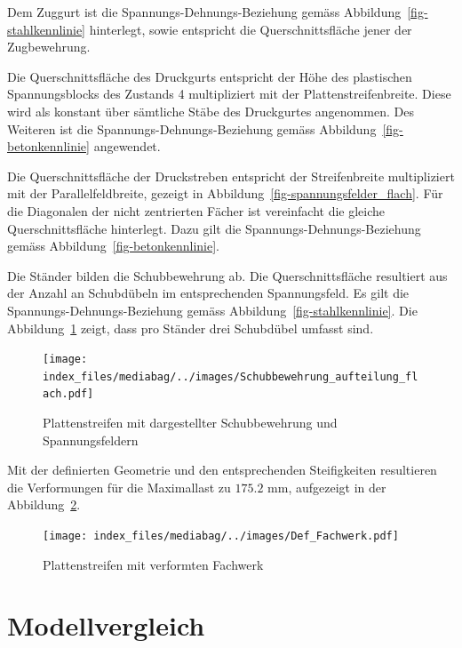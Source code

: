 \documentclass[
  12pt,
  letterpaper,
  egregdoesnotlikesansseriftitles]{scrreprt}
\begin{document}
Dem Zuggurt ist die Spannungs-Dehnungs-Beziehung gemäss
Abbildung~\ref{fig-stahlkennlinie} hinterlegt, sowie entspricht die
Querschnittsfläche jener der Zugbewehrung.

Die Querschnittsfläche des Druckgurts entspricht der Höhe des
plastischen Spannungsblocks des Zustands 4 multipliziert mit der
Plattenstreifenbreite. Diese wird als konstant über sämtliche Stäbe des
Druckgurtes angenommen. Des Weiteren ist die
Spannungs-Dehnungs-Beziehung gemäss Abbildung~\ref{fig-betonkennlinie}
angewendet.

Die Querschnittsfläche der Druckstreben entspricht der Streifenbreite
multipliziert mit der Parallelfeldbreite, gezeigt in
Abbildung~\ref{fig-spannungsfelder_flach}. Für die Diagonalen der nicht
zentrierten Fächer ist vereinfacht die gleiche Querschnittsfläche
hinterlegt. Dazu gilt die Spannungs-Dehnungs-Beziehung gemäss
Abbildung~\ref{fig-betonkennlinie}.

Die Ständer bilden die Schubbewehrung ab. Die Querschnittsfläche
resultiert aus der Anzahl an Schubdübeln im entsprechenden
Spannungsfeld. Es gilt die Spannungs-Dehnungs-Beziehung gemäss
Abbildung~\ref{fig-stahlkennlinie}. Die
Abbildung~\ref{fig-schubbew_fw_flach} zeigt, dass pro Ständer drei
Schubdübel umfasst sind.

\begin{figure}[H]

{\centering \texttt{[image: index\_files/mediabag/../images/Schubbewehrung\_aufteilung\_flach.pdf]}

}

\caption{\label{fig-schubbew_fw_flach}Plattenstreifen mit dargestellter
Schubbewehrung und Spannungsfeldern}

\end{figure}

Mit der definierten Geometrie und den entsprechenden Steifigkeiten
resultieren die Verformungen für die Maximallast zu
\(175.2 \text{ mm}\), aufgezeigt in der
Abbildung~\ref{fig-deformation_fw}.

\begin{figure}[H]

{\centering \texttt{[image: index\_files/mediabag/../images/Def\_Fachwerk.pdf]}

}

\caption{\label{fig-deformation_fw}Plattenstreifen mit verformten
Fachwerk}

\end{figure}

\hypertarget{modellvergleich}{%
\section{Modellvergleich}\label{modellvergleich}}
\end{document}
